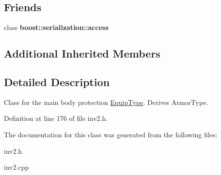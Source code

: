 \subsection*{Friends}
\begin{DoxyCompactItemize}
\item 
\hypertarget{class_cuirass_ac98d07dd8f7b70e16ccb9a01abf56b9c}{}\label{class_cuirass_ac98d07dd8f7b70e16ccb9a01abf56b9c} 
class {\bfseries boost\+::serialization\+::access}
\end{DoxyCompactItemize}
\subsection*{Additional Inherited Members}


\subsection{Detailed Description}
Class for the main body protection \hyperlink{class_equip_type}{Equip\+Type}. Derives Armor\+Type. 

Definition at line 176 of file inv2.\+h.



The documentation for this class was generated from the following files\+:\begin{DoxyCompactItemize}
\item 
inv2.\+h\item 
inv2.\+cpp\end{DoxyCompactItemize}
